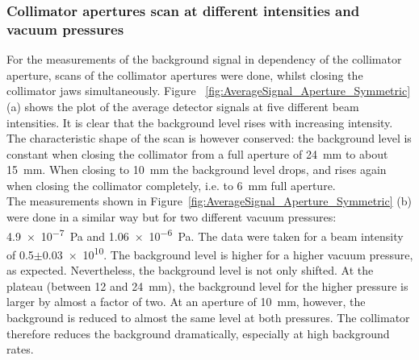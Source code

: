\subsubsection{Collimator apertures scan at different intensities and vacuum pressures}
\label{aperture_scans}
For the measurements of the background signal in dependency of the collimator aperture, scans of the collimator apertures were done, whilst closing the collimator jaws simultaneously. 
Figure ~\ref{fig:AverageSignal_Aperture_Symmetric} (a) shows the plot of the average detector signals at five different beam intensities. 
It is clear that the background level rises with increasing intensity. 
The characteristic shape of the scan is however conserved: 
the background level is constant when closing the collimator from a full aperture of \SI{24}{\milli\metre} to about \SI{15}{\milli\metre}. 
When closing to \SI{10}{\milli\metre} the background level drops, and rises again when closing the collimator completely, i.e. to \SI{6}{\milli\metre} full aperture. 
\\The measurements shown in Figure~\ref{fig:AverageSignal_Aperture_Symmetric} (b) were done in a similar way but for two different vacuum pressures: \SI{4.9e-7}{\pascal} and \SI{1.06e-6}{\pascal}. 
The data were taken for a beam intensity of \num{0.5}$\pm$\num{0.03e10}. 
The background level is higher for a higher vacuum pressure, as expected. 
Nevertheless, the background level is not only shifted. 
At the plateau (between 12 and \SI{24}{\milli\metre}), the background level for the higher pressure is larger by almost a factor of two.
At an aperture of \SI{10}{\milli\metre}, however, the background is reduced to almost the same level at both pressures. 
The collimator therefore reduces the background dramatically, especially at high background rates.

